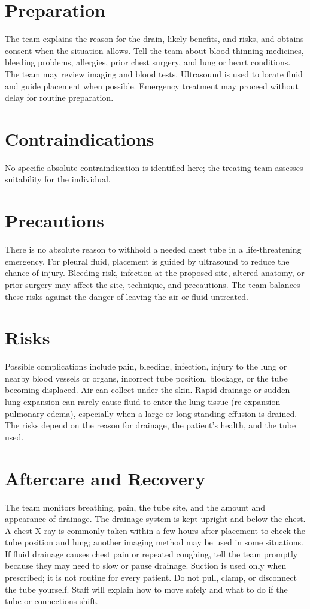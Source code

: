 \section*{Preparation}
The team explains the reason for the drain, likely benefits, and risks, and obtains consent when the situation allows. Tell the team about blood-thinning medicines, bleeding problems, allergies, prior chest surgery, and lung or heart conditions. The team may review imaging and blood tests. Ultrasound is used to locate fluid and guide placement when possible. Emergency treatment may proceed without delay for routine preparation.

\section*{Contraindications}
No specific absolute contraindication is identified here; the treating team assesses suitability for the individual.

\section*{Precautions}
There is no absolute reason to withhold a needed chest tube in a life-threatening emergency. For pleural fluid, placement is guided by ultrasound to reduce the chance of injury. Bleeding risk, infection at the proposed site, altered anatomy, or prior surgery may affect the site, technique, and precautions. The team balances these risks against the danger of leaving the air or fluid untreated.

\section*{Risks}
Possible complications include pain, bleeding, infection, injury to the lung or nearby blood vessels or organs, incorrect tube position, blockage, or the tube becoming displaced. Air can collect under the skin. Rapid drainage or sudden lung expansion can rarely cause fluid to enter the lung tissue (re-expansion pulmonary edema), especially when a large or long-standing effusion is drained. The risks depend on the reason for drainage, the patient's health, and the tube used.

\section*{Aftercare and Recovery}
The team monitors breathing, pain, the tube site, and the amount and appearance of drainage. The drainage system is kept upright and below the chest. A chest X-ray is commonly taken within a few hours after placement to check the tube position and lung; another imaging method may be used in some situations. If fluid drainage causes chest pain or repeated coughing, tell the team promptly because they may need to slow or pause drainage. Suction is used only when prescribed; it is not routine for every patient. Do not pull, clamp, or disconnect the tube yourself. Staff will explain how to move safely and what to do if the tube or connections shift.

